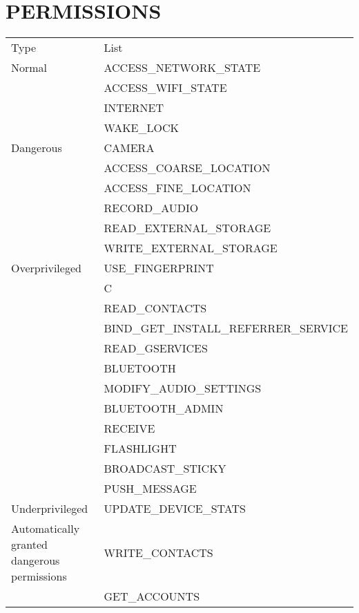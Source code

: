 \documentclass[12p]{article}
\begin{document}
\section{PERMISSIONS}
	\begin{longtable}{p{3cm} p{10cm} }
	\rowcolor{grannysmithapple!70} Type & List \\
Normal &  ACCESS\_NETWORK\_STATE \\ 
 &  ACCESS\_WIFI\_STATE \\ 
 &  INTERNET \\ 
 &  WAKE\_LOCK \\ 
\hline
Dangerous &  CAMERA \\ 
 &  ACCESS\_COARSE\_LOCATION \\ 
 &  ACCESS\_FINE\_LOCATION \\ 
 &  RECORD\_AUDIO \\ 
 &  READ\_EXTERNAL\_STORAGE \\ 
 &  WRITE\_EXTERNAL\_STORAGE \\ 
\hline
Overprivileged &  USE\_FINGERPRINT \\ 
 &  C \\ 
 &  READ\_CONTACTS \\ 
 &  BIND\_GET\_INSTALL\_REFERRER\_SERVICE \\ 
 &  READ\_GSERVICES \\ 
 &  BLUETOOTH \\ 
 &  MODIFY\_AUDIO\_SETTINGS \\ 
 &  BLUETOOTH\_ADMIN \\ 
 &  RECEIVE \\ 
 &  FLASHLIGHT \\ 
 &  BROADCAST\_STICKY \\ 
 &  PUSH\_MESSAGE \\ 
\hline
Underprivileged &  UPDATE\_DEVICE\_STATS \\ 
\hline
Automatically granted dangerous permissions &  WRITE\_CONTACTS \\ 
 &  GET\_ACCOUNTS \\ 
\hline
	\end{longtable}
\end{document}
